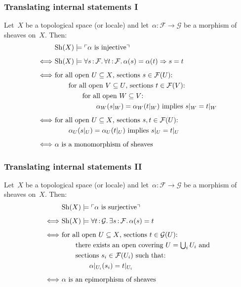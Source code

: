 \documentclass[12pt,utf8,notheorems,compress,t]{beamer}
\newcommand{\F}{\mathcal{F}}
\renewcommand{\G}{\mathcal{G}}
\newcommand{\Sh}{\mathrm{Sh}}
\renewcommand{\_}{\mathpunct{.}}
\newcommand{\?}{\,{:}\,}
\newcommand{\speak}[1]{\ulcorner\text{\textnormal{#1}}\urcorner}
\begin{document}
\begin{frame}\frametitle{Translating internal statements I}
  Let~$X$ be a topological space (or locale) and let~$\alpha : \F \to \G$ be a
  morphism of sheaves on~$X$. Then:
  \allowdisplaybreaks
  \begin{align*}
    & \Sh(X) \models \speak{$\alpha$ is injective} \\[0.5em]
    \Longleftrightarrow\
    & \Sh(X) \models \forall s\?\F\_ \forall t\?\F\_ \alpha(s) = \alpha(t) \Rightarrow s = t \\[0.5em]
    \Longleftrightarrow\ &
      \text{for all open~$U \subseteq X$, sections $s \in \F(U)$:} \\
    &\qquad
      \text{for all open~$V \subseteq U$, sections $t \in \F(V)$:} \\
    &\qquad\qquad
        \text{for all open~$W \subseteq V$:} \\
    &\qquad\qquad\qquad
          \text{$\alpha_W(s|_W) = \alpha_W(t|_W)$ implies $s|_W = t|_W$} \\[0.5em]
    \Longleftrightarrow\ &
      \text{for all open~$U \subseteq X$, sections $s, t \in \F(U)$:} \\
    &\qquad
          \text{$\alpha_U(s|_U) = \alpha_U(t|_U)$ implies $s|_U = t|_U$} \\[0.5em]
    \Longleftrightarrow\ &
      \text{$\alpha$ is a monomorphism of sheaves}
  \end{align*}
\end{frame}

\begin{frame}\frametitle{Translating internal statements II}
  Let~$X$ be a topological space (or locale) and let~$\alpha : \F \to \G$ be a
  morphism of sheaves on~$X$. Then:
  \allowdisplaybreaks
  \begin{align*}
    & \Sh(X) \models \speak{$\alpha$ is surjective} \\[0.5em]
    \Longleftrightarrow\
    & \Sh(X) \models \forall t\?\G\_ \exists s\?\F\_ \alpha(s) = t \\[0.5em]
    \Longleftrightarrow\ &
      \text{for all open~$U \subseteq X$, sections $t \in \G(U)$:} \\
    &\qquad
      \text{there exists an open covering~$U = \textstyle\bigcup_i U_i$ and} \\
    &\qquad
      \text{sections~$s_i \in \F(U_i)$ such that:} \\
    &\qquad\qquad
        \alpha|_{U_i}(s_i) = t|_{U_i} \\[0.5em]
    \Longleftrightarrow\ &
      \text{$\alpha$ is an epimorphism of sheaves}
  \end{align*}
\end{frame}
\end{document}
